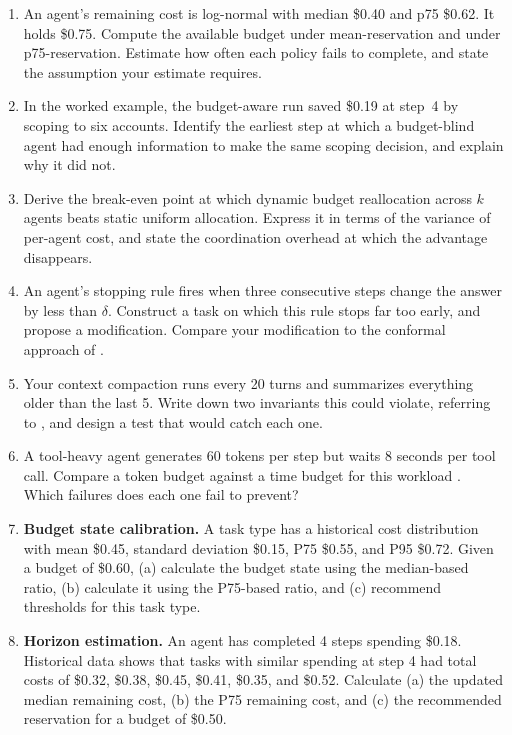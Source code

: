 \documentclass[11pt]{book}
\begin{document}
\begin{enumerate}
\item An agent's remaining cost is log-normal with median \$0.40 and p75 \$0.62. It holds \$0.75. Compute the available budget under mean-reservation and under p75-reservation. Estimate how often each policy fails to complete, and state the assumption your estimate requires.

\item In the worked example, the budget-aware run saved \$0.19 at step~4 by scoping to six accounts. Identify the earliest step at which a budget-blind agent had enough information to make the same scoping decision, and explain why it did not.

\item Derive the break-even point at which dynamic budget reallocation across $k$ agents beats static uniform allocation. Express it in terms of the variance of per-agent cost, and state the coordination overhead at which the advantage disappears.

\item An agent's stopping rule fires when three consecutive steps change the answer by less than $\delta$. Construct a task on which this rule stops far too early, and propose a modification. Compare your modification to the conformal approach of \cite{conformalthinking2026}.

\item Your context compaction runs every 20 turns and summarizes everything older than the last 5. Write down two invariants this could violate, referring to \cite{govdecay2026}, and design a test that would catch each one.

\item A tool-heavy agent generates 60 tokens per step but waits 8 seconds per tool call. Compare a token budget against a time budget for this workload \cite{timelymachine2026}. Which failures does each one fail to prevent?

\item \textbf{Budget state calibration.} A task type has a historical cost distribution with mean \$0.45, standard deviation \$0.15, P75 \$0.55, and P95 \$0.72. Given a budget of \$0.60, (a) calculate the budget state using the median-based ratio, (b) calculate it using the P75-based ratio, and (c) recommend thresholds for this task type.

\item \textbf{Horizon estimation.} An agent has completed 4 steps spending \$0.18. Historical data shows that tasks with similar spending at step 4 had total costs of \$0.32, \$0.38, \$0.45, \$0.41, \$0.35, and \$0.52. Calculate (a) the updated median remaining cost, (b) the P75 remaining cost, and (c) the recommended reservation for a budget of \$0.50.
\end{enumerate}
\end{document}
